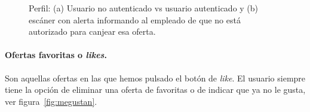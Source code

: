 \begin{figure}[tbp]
\caption{Perfil: (a) Usuario no autenticado vs usuario autenticado y (b) escáner con alerta informando al empleado de que no está autorizado para canjear esa oferta.}
\end{figure}

\paragraph{Ofertas favoritas o \textit{likes}.} Son aquellas ofertas en las que hemos pulsado el botón de \textit{like}. El usuario siempre tiene la opción de eliminar una oferta de favoritas o de indicar que ya no le gusta, ver figura~\ref{fig:megustan}.

